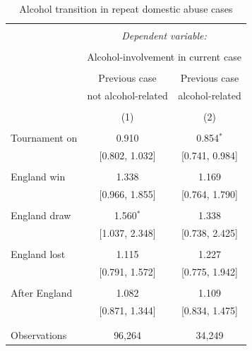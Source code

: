 \documentclass[12pt, a4paper]{article}
\begin{document}
\begin{table}
\centering
 \caption{Alcohol transition in repeat domestic abuse cases}
  \label{alctrans}
  \begin{threeparttable}
\begin{tabular}{@{\extracolsep{5pt}}lcc} 
\\[-1.8ex]\hline 
\hline \\[-1.8ex] 
 & \multicolumn{2}{c}{\textit{Dependent variable:}} \\ 
\cline{2-3} 
\\[-1.8ex] & \multicolumn{2}{c}{Alcohol-involvement in current case} \\ 
\\[-1.8ex] & Previous case & Previous case\\
& not alcohol-related & alcohol-related\\ 
\\[-1.8ex] & (1) & (2)\\ 
\hline \\[-1.8ex] 
 Tournament on & 0.910 & 0.854$^{*}$ \\ 
  & [0.802, 1.032] & [0.741, 0.984] \\ 
  & & \\ 
 England win & 1.338 & 1.169 \\ 
  & [0.966, 1.855] & [0.764, 1.790] \\ 
  & & \\ 
 England draw & 1.560$^{*}$ & 1.338 \\ 
  & [1.037, 2.348] & [0.738, 2.425] \\ 
  & & \\ 
 England lost & 1.115 & 1.227 \\ 
  & [0.791, 1.572] & [0.775, 1.942] \\ 
  & & \\ 
 After England & 1.082 & 1.109 \\ 
  & [0.871, 1.344] & [0.834, 1.475] \\ 
  & & \\ 
\hline \\[-1.8ex] 
Observations & 96,264 & 34,249 \\ 


\end{tabular}
\end{threeparttable}
\end{table}
\end{document}

